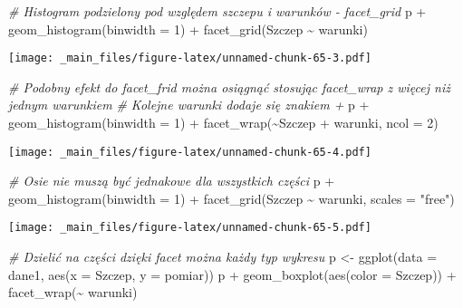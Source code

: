 \documentclass[
]{book}
\newenvironment{Shaded}{\begin{snugshade}}{\end{snugshade}}
\newcommand{\AttributeTok}[1]{\textcolor[rgb]{0.77,0.63,0.00}{#1}}
\newcommand{\CommentTok}[1]{\textcolor[rgb]{0.56,0.35,0.01}{\textit{#1}}}
\newcommand{\DecValTok}[1]{\textcolor[rgb]{0.00,0.00,0.81}{#1}}
\newcommand{\FunctionTok}[1]{\textcolor[rgb]{0.00,0.00,0.00}{#1}}
\newcommand{\NormalTok}[1]{#1}
\newcommand{\OtherTok}[1]{\textcolor[rgb]{0.56,0.35,0.01}{#1}}
\newcommand{\SpecialCharTok}[1]{\textcolor[rgb]{0.00,0.00,0.00}{#1}}
\newcommand{\StringTok}[1]{\textcolor[rgb]{0.31,0.60,0.02}{#1}}
\begin{document}
\begin{Shaded}
\begin{Highlighting}[]
\CommentTok{\# Histogram podzielony pod względem szczepu i warunków {-} facet\_grid}
\NormalTok{p }\SpecialCharTok{+} \FunctionTok{geom\_histogram}\NormalTok{(}\AttributeTok{binwidth =} \DecValTok{1}\NormalTok{) }\SpecialCharTok{+} \FunctionTok{facet\_grid}\NormalTok{(Szczep }\SpecialCharTok{\textasciitilde{}}\NormalTok{ warunki)}
\end{Highlighting}
\end{Shaded}

\texttt{[image: \_main\_files/figure-latex/unnamed-chunk-65-3.pdf]}

\begin{Shaded}
\begin{Highlighting}[]
\CommentTok{\# Podobny efekt do facet\_frid można osiągnąć stosując facet\_wrap z więcej niż jednym warunkiem}
\CommentTok{\# Kolejne warunki dodaje się znakiem +}
\NormalTok{p }\SpecialCharTok{+} \FunctionTok{geom\_histogram}\NormalTok{(}\AttributeTok{binwidth =} \DecValTok{1}\NormalTok{) }\SpecialCharTok{+} \FunctionTok{facet\_wrap}\NormalTok{(}\SpecialCharTok{\textasciitilde{}}\NormalTok{Szczep }\SpecialCharTok{+}\NormalTok{ warunki, }\AttributeTok{ncol =} \DecValTok{2}\NormalTok{)}
\end{Highlighting}
\end{Shaded}

\texttt{[image: \_main\_files/figure-latex/unnamed-chunk-65-4.pdf]}

\begin{Shaded}
\begin{Highlighting}[]
\CommentTok{\# Osie nie muszą być jednakowe dla wszystkich części}
\NormalTok{p }\SpecialCharTok{+} \FunctionTok{geom\_histogram}\NormalTok{(}\AttributeTok{binwidth =} \DecValTok{1}\NormalTok{) }\SpecialCharTok{+} \FunctionTok{facet\_grid}\NormalTok{(Szczep }\SpecialCharTok{\textasciitilde{}}\NormalTok{ warunki, }\AttributeTok{scales =} \StringTok{"free"}\NormalTok{)}
\end{Highlighting}
\end{Shaded}

\texttt{[image: \_main\_files/figure-latex/unnamed-chunk-65-5.pdf]}

\begin{Shaded}
\begin{Highlighting}[]
\CommentTok{\# Dzielić na części dzięki facet można każdy typ wykresu}
\NormalTok{p }\OtherTok{\textless{}{-}} \FunctionTok{ggplot}\NormalTok{(}\AttributeTok{data =}\NormalTok{ dane1, }\FunctionTok{aes}\NormalTok{(}\AttributeTok{x =}\NormalTok{ Szczep, }\AttributeTok{y =}\NormalTok{ pomiar))}
\NormalTok{p }\SpecialCharTok{+} \FunctionTok{geom\_boxplot}\NormalTok{(}\FunctionTok{aes}\NormalTok{(}\AttributeTok{color =}\NormalTok{ Szczep)) }\SpecialCharTok{+} \FunctionTok{facet\_wrap}\NormalTok{(}\SpecialCharTok{\textasciitilde{}}\NormalTok{ warunki)}
\end{Highlighting}
\end{Shaded}
\end{document}
